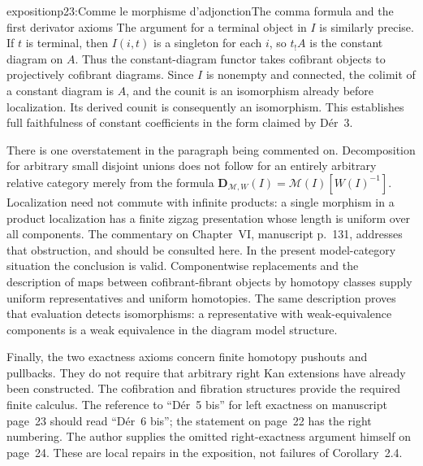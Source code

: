 \begin{dcomment}{exposition}{p23:Comme le morphisme d'adjonction}{The comma formula and the first derivator axioms}
The argument for a terminal object in $I$ is similarly precise. If $t$ is terminal, then $I(i,t)$ is a singleton for each $i$, so $t_!A$ is the constant diagram on $A$. Thus the constant-diagram functor takes cofibrant objects to projectively cofibrant diagrams. Since $I$ is nonempty and connected, the colimit of a constant diagram is $A$, and the counit is an isomorphism already before localization. Its derived counit is consequently an isomorphism. This establishes full faithfulness of constant coefficients in the form claimed by Dér~3.

There is one overstatement in the paragraph being commented on. Decomposition for arbitrary small disjoint unions does not follow for an entirely arbitrary relative category merely from the formula $\mathbf D_{\mathcal M,W}(I)=\mathcal M(I)[W(I)^{-1}]$. Localization need not commute with infinite products: a single morphism in a product localization has a finite zigzag presentation whose length is uniform over all components. The commentary on Chapter~VI, manuscript p.~131, addresses that obstruction, and should be consulted here. In the present model-category situation the conclusion is valid. Componentwise replacements and the description of maps between cofibrant-fibrant objects by homotopy classes supply uniform representatives and uniform homotopies. The same description proves that evaluation detects isomorphisms: a representative with weak-equivalence components is a weak equivalence in the diagram model structure.

Finally, the two exactness axioms concern finite homotopy pushouts and pullbacks. They do not require that arbitrary right Kan extensions have already been constructed. The cofibration and fibration structures provide the required finite calculus. The reference to ``Dér~5 bis'' for left exactness on manuscript page~23 should read ``Dér~6 bis''; the statement on page~22 has the right numbering. The author supplies the omitted right-exactness argument himself on page~24. These are local repairs in the exposition, not failures of Corollary~2.4.
\end{dcomment}

